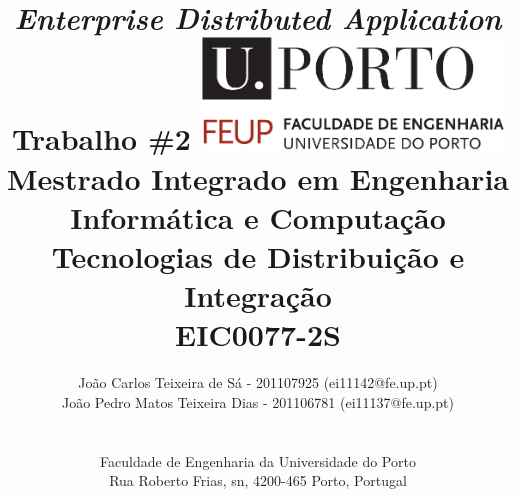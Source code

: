 \documentclass[12pt]{article}
\begin{document}
\setlength{\textwidth}{16cm}
\setlength{\textheight}{22cm}
\title{\huge\textbf{\textit{Enterprise Distributed Application}}\linebreak
\Large\textbf{\\Trabalho \#2}\linebreak\linebreak\linebreak
\includegraphics[width=8cm]{feup.pdf}\linebreak \linebreak
\large{Mestrado Integrado em Engenharia Informática e Computação} \linebreak
\large{Tecnologias de Distribuição e Integração \\ EIC0077-2S}\linebreak
}
\author{
João Carlos Teixeira de Sá - 201107925 (ei11142@fe.up.pt)\\
João Pedro Matos Teixeira Dias - 201106781 (ei11137@fe.up.pt)\\
\\
\\ Faculdade de Engenharia da Universidade do Porto \\ Rua Roberto Frias, s\/n, 4200-465 Porto, Portugal
 \vspace{1cm}}
\maketitle
\thispagestyle{empty}


\newpage

\tableofcontents


\end{document}
